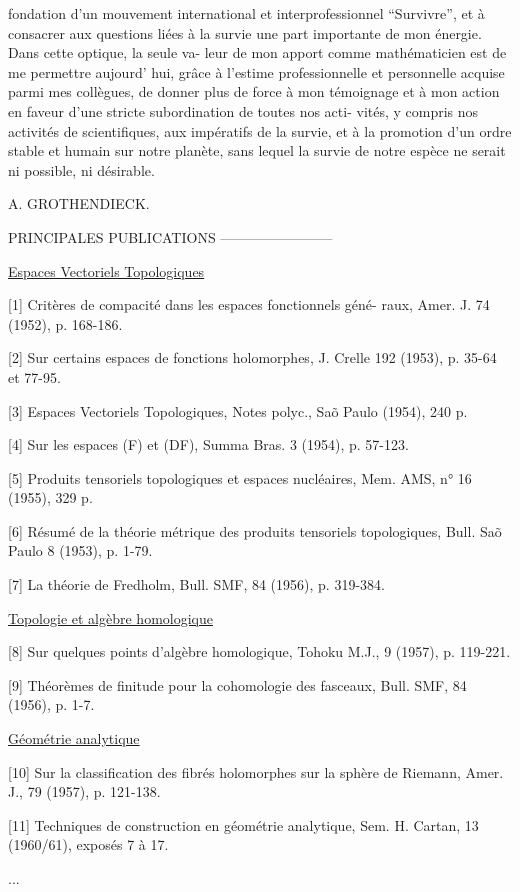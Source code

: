 
fondation d'un mouvement international et interprofessionnel
``Survivre'', et à consacrer aux questions liées à la survie une
part importante de mon énergie. Dans cette optique, la seule va-%
\margin{(}leur de mon apport comme mathématicien est de me permettre aujourd'
hui, grâce à l'estime professionnelle et personnelle acquise parmi
mes collègues, de donner plus de force à mon témoignage et à mon
action en faveur d'une stricte subordination de toutes nos acti-%
vités, y compris nos activités de scientifiques, aux impératifs
\margin{(}de la survie, et à la promotion d'un ordre stable et humain sur
notre planète, sans lequel la survie de notre espèce ne serait
ni possible, ni désirable.

A. GROTHENDIECK.

PRINCIPALES PUBLICATIONS
------------------------

\uline{Espaces Vectoriels Topologiques}

[1] Critères de compacité dans les espaces fonctionnels géné-%
raux, Amer. J. 74 (1952), p. 168-186.

[2] Sur certains espaces de fonctions holomorphes, J. Crelle
192 (1953), p. 35-64 et 77-95.

[3] Espaces Vectoriels Topologiques, Notes polyc., Sa\~o Paulo
(1954), 240 p.

[4] Sur les espaces (F) et (DF), Summa Bras. 3 (1954),
p. 57-123.

[5] Produits tensoriels topologiques et espaces nucléaires,
Mem. AMS, n° 16 (1955), 329 p.

[6] Résumé de la théorie métrique des produits tensoriels
topologiques, Bull. Sa\~o Paulo 8 (1953), p. 1-79.

[7] La théorie de Fredholm, Bull. SMF, 84 (1956), p. 319-384.

\uline{Topologie et algèbre homologique}

[8] Sur quelques points d'algèbre homologique, Tohoku M.J.,
9 (1957), p. 119-221.

[9] Théorèmes de finitude pour la cohomologie des fasceaux,
Bull. SMF, 84 (1956), p. 1-7.

\uline{Géométrie analytique}

[10] Sur la classification des fibrés holomorphes sur la
sphère de Riemann, Amer. J., 79 (1957), p. 121-138.

[11] Techniques de construction en géométrie analytique,
Sem. H. Cartan, 13 (1960/61), exposés 7 à 17.

...

